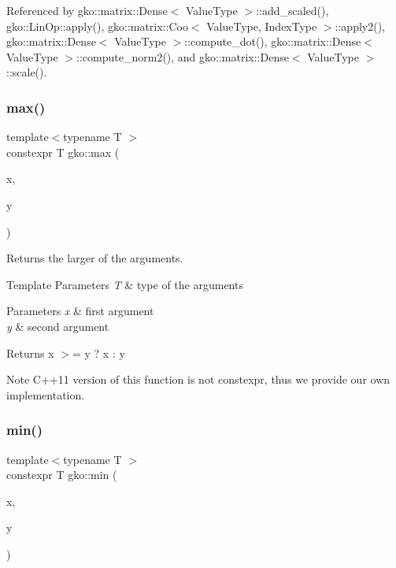 Referenced by gko\+::matrix\+::\+Dense$<$ Value\+Type $>$\+::add\+\_\+scaled(), gko\+::\+Lin\+Op\+::apply(), gko\+::matrix\+::\+Coo$<$ Value\+Type, Index\+Type $>$\+::apply2(), gko\+::matrix\+::\+Dense$<$ Value\+Type $>$\+::compute\+\_\+dot(), gko\+::matrix\+::\+Dense$<$ Value\+Type $>$\+::compute\+\_\+norm2(), and gko\+::matrix\+::\+Dense$<$ Value\+Type $>$\+::scale().

\mbox{\label{namespacegko_af1812df45c6ec07780d579a12b64c753}} 
\subsubsection{\texorpdfstring{max()}{max()}}
{\footnotesize\ttfamily template$<$typename T $>$ \\
constexpr T gko\+::max (\begin{DoxyParamCaption}\item[{const T \&}]{x,  }\item[{const T \&}]{y }\end{DoxyParamCaption})\hspace{0.3cm}{\ttfamily [inline]}}



Returns the larger of the arguments. 


\begin{DoxyTemplParams}{Template Parameters}
{\em T} & type of the arguments\\
\hline
\end{DoxyTemplParams}

\begin{DoxyParams}{Parameters}
{\em x} & first argument \\
\hline
{\em y} & second argument\\
\hline
\end{DoxyParams}
\begin{DoxyReturn}{Returns}
x $>$= y ? x \+: y
\end{DoxyReturn}
\begin{DoxyNote}{Note}
C++11 version of this function is not constexpr, thus we provide our own implementation. 
\end{DoxyNote}
\mbox{\label{namespacegko_aaaf8487194bcb40b528969c187a413a0}} 
\subsubsection{\texorpdfstring{min()}{min()}}
{\footnotesize\ttfamily template$<$typename T $>$ \\
constexpr T gko\+::min (\begin{DoxyParamCaption}\item[{const T \&}]{x,  }\item[{const T \&}]{y }\end{DoxyParamCaption})\hspace{0.3cm}{\ttfamily [inline]}}



